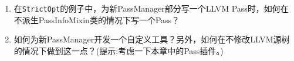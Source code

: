 
\begin{enumerate}
\item 在\texttt{StrictOpt}的例子中，为新PassManager部分写一个LLVM Pass时，如何在不派生PassInfoMixin类的情况下写一个Pass？

\item 如何为新PassManager开发一个自定义工具？另外，如何在不修改LLVM源树的情况下做到这一点？(提示:考虑一下本章中的Pass插件。)

\end{enumerate}
